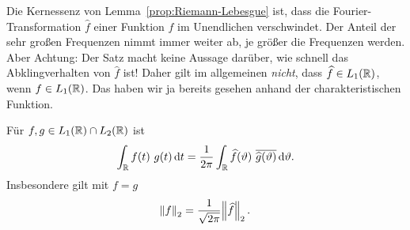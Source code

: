 \begin{remark}
Die Kernessenz von Lemma~\ref{prop:Riemann-Lebesgue} ist, dass die Fourier-Transformation 
$ \widehat{f} $ einer Funktion $ f $ im Unendlichen verschwindet. Der Anteil der sehr großen
Frequenzen nimmt immer weiter ab, je größer die Frequenzen werden. Aber Achtung: Der Satz macht
keine Aussage darüber, wie schnell das Abklingverhalten von $ \widehat{f} $ ist! Daher gilt im
allgemeinen \emph{nicht}, dass $ \widehat{f} \in L_{1}(\mathbb{R}) $, wenn $ f \in L_{1}(\mathbb{R}) $. Das haben
wir ja bereits gesehen anhand der charakteristischen Funktion.
\end{remark}

\begin{proposition}
Für $ f, g \in L_{1}(\mathbb{R}) \cap L_{2}(\mathbb{R}) $ ist
\[
    \int_{\R} f(t) \ g(t) \dif t 
  = \frac{1}{2\pi} \int_{\R} \widehat{f}(\vartheta) \ \overline{\widehat{g}(\vartheta)}
      \dif \vartheta.
\]
Insbesondere gilt mit $ f = g $
\[
  \norm{f}_{2} = \frac{1}{\sqrt{2\pi}} \norm{\widehat{f}}_{2}.
\]
\end{proposition}

